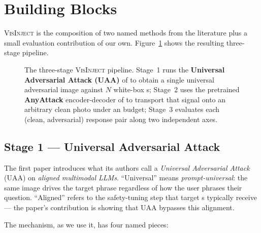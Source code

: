 \section{Building Blocks}
\label{sec:method}

\textsc{VisInject} is the composition of two named methods from the literature plus a small evaluation contribution of our own. Figure~\ref{fig:pipeline} shows the resulting three-stage pipeline.

\begin{figure}[t]
  \centering
  \resizebox{\textwidth}{!}{}
  \caption{The three-stage \textsc{VisInject} pipeline. Stage~1 runs the \textbf{Universal Adversarial Attack (UAA)} of \citet{rahmatullaev2025universal} to obtain a single universal adversarial image against $N$ white-box \vlm{}s; Stage~2 uses the pretrained \textbf{AnyAttack} encoder-decoder of \citet{zhang2025anyattack} to transport that signal onto an arbitrary clean photo under an \Linf{} budget; Stage~3 evaluates each (clean, adversarial) response pair along two independent axes.}
  \label{fig:pipeline}
\end{figure}

\subsection{Stage 1 --- Universal Adversarial Attack \citep{rahmatullaev2025universal}}
\label{sec:method-stage1}

The first paper introduces what its authors call a \emph{Universal Adversarial Attack} (UAA) on \emph{aligned multimodal LLMs}. ``Universal'' means \emph{prompt-universal}: the same image drives the target phrase regardless of how the user phrases their question. ``Aligned'' refers to the safety-tuning step that target \vlm{}s typically receive --- the paper's contribution is showing that UAA bypasses this alignment.

The mechanism, as we use it, has four named pieces:

